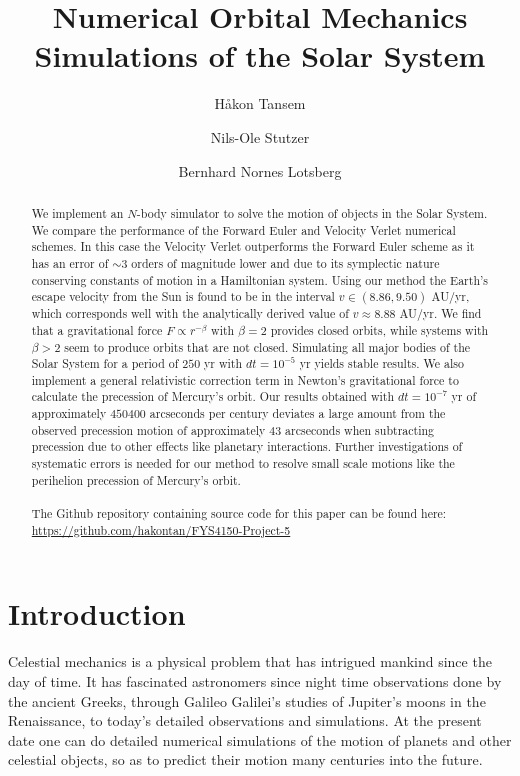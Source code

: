 \documentclass[twocolumn]{aastex62}
\begin{document}
\title{\Large Numerical Orbital Mechanics Simulations of the Solar System}

\author{Håkon Tansem}

\author{Nils-Ole Stutzer}

\author{Bernhard Nornes Lotsberg}

\begin{abstract}
We implement an $N$-body simulator to solve the motion of objects in the 
Solar System. We compare the performance of the Forward Euler and 
Velocity Verlet numerical schemes. In this case the Velocity Verlet 
outperforms the Forward Euler scheme as it has an error of $\sim 3$ 
orders of magnitude lower and due to its symplectic nature conserving 
constants of motion in a Hamiltonian system.
Using our method the Earth's escape velocity from the Sun is found to be 
in the interval $v\in (8.86, 9.50)$ AU/yr, which corresponds well with 
the analytically derived value of $v\approx 8.88$ AU/yr. We find that a gravitational force $F\propto r^{-\beta}$ with $\beta=2$ provides closed orbits, while systems with $\beta>2$ seem to produce orbits that are not closed. Simulating all major bodies of the Solar System for a period of $250$ yr with $dt=10^{-5}$ yr yields stable results.  We also implement a general relativistic correction term in Newton's gravitational force to calculate the precession of Mercury's orbit. Our results obtained with $dt=10^{-7}$ yr of approximately $450400$ arcseconds per century deviates a large amount from the observed precession motion of approximately $43$ arcseconds when subtracting precession due to other effects like planetary interactions. Further investigations of systematic errors is needed for our method to resolve small scale motions like the perihelion precession of Mercury's orbit.
\\\\
The Github repository containing source code for this paper can be found here:\\ \url{https://github.com/hakontan/FYS4150-Project-5}

\end{abstract}

\section{Introduction} \label{sec:intro}
Celestial mechanics is a physical problem that has intrigued mankind since the
day of time. It has fascinated astronomers since night time observations done by
the ancient Greeks, through Galileo Galilei's studies of Jupiter's moons in the
Renaissance, to today's detailed observations and simulations. At the present
date one can do detailed numerical simulations of the motion of planets and
other celestial objects, so as to predict their motion many centuries into the
future.
\end{document}
